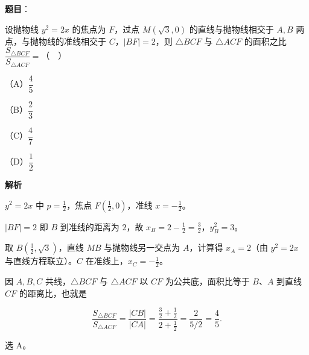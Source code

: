 \begin{answer}

\textbf{题目}：

设抛物线 $y^2=2x$ 的焦点为 $F$，过点 $M(\sqrt3,0)$ 的直线与抛物线相交于 $A,B$ 两点，与抛物线的准线相交于 $C$，$|BF|=2$，则 $\triangle BCF$ 与 $\triangle ACF$ 的面积之比 $\dfrac{S_{\triangle BCF}}{S_{\triangle ACF}}=$（　）

（A）$\dfrac45$

（B）$\dfrac23$

（C）$\dfrac47$

（D）$\dfrac12$

\textbf{解析}

$y^2=2x$ 中 $p=\frac12$，焦点 $F\left(\frac12,0\right)$，准线 $x=-\frac12$。

$|BF|=2$ 即 $B$ 到准线的距离为 $2$，故 $x_B=2-\frac12=\frac32$，$y_B^2=3$。

取 $B\left(\frac32,\sqrt3\right)$，直线 $MB$ 与抛物线另一交点为 $A$，计算得 $x_A=2$（由 $y^2=2x$ 与直线方程联立）。$C$ 在准线上，$x_C=-\frac12$。

因 $A,B,C$ 共线，$\triangle BCF$ 与 $\triangle ACF$ 以 $CF$ 为公共底，面积比等于 $B$、$A$ 到直线 $CF$ 的距离比，也就是

\nopagebreak[4]
\[\frac{S_{\triangle BCF}}{S_{\triangle ACF}}
=\frac{|CB|}{|CA|}
=\frac{\frac32+\frac12}{2+\frac12}=\frac{2}{5/2}=\frac45 .\]

选 A。


\end{answer}
